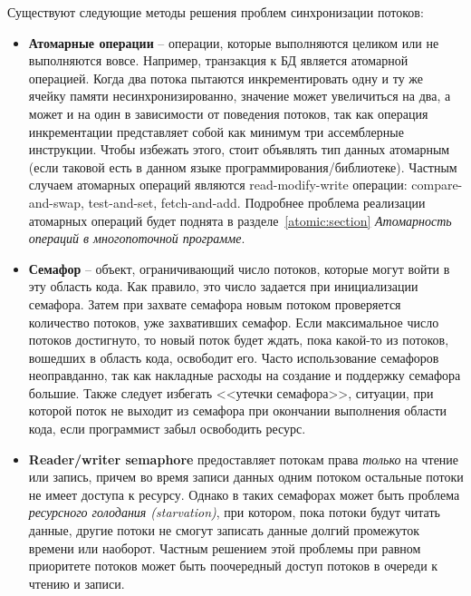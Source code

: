 Существуют следующие методы решения проблем синхронизации потоков:
\begin{itemize}
    \item\textbf{Атомарные операции} -- операции, которые выполняются целиком или не выполняются вовсе. Например, транзакция к БД является атомарной операцией. Когда два потока пытаются инкрементировать одну и ту же ячейку памяти несинхронизированно, значение может увеличиться на два, а может и на один в зависимости от поведения потоков, так как операция инкрементации представляет собой как минимум три ассемблерные инструкции. Чтобы избежать этого, стоит объявлять тип данных атомарным (если таковой есть в данном языке программирования/библиотеке). Частным случаем атомарных операций являются read-modify-write операции: compare-and-swap, test-and-set, fetch-and-add. Подробнее проблема реализации атомарных операций будет поднята в разделе~\ref{atomic:section} \textit{Атомарность операций в многопоточной программе}.
    
    \item\textbf{Семафор} -- объект, ограничивающий число потоков, которые могут войти в эту область кода. Как правило, это число задается при инициализации семафора. Затем при захвате семафора новым потоком проверяется количество потоков, уже захвативших семафор. Если максимальное число потоков достигнуто, то новый поток будет ждать, пока какой-то из потоков, вошедших в область кода, освободит его. Часто использование семафоров неоправданно, так как накладные расходы на создание и поддержку семафора большие. Также следует избегать <<утечки семафора>>, ситуации, при которой поток не выходит из семафора при окончании выполнения области кода, если программист забыл освободить ресурс.
    
    \item\textbf{Reader/writer semaphore} предоставляет потокам права \textit{только} на чтение или запись, причем во время записи данных одним потоком остальные потоки не имеет доступа к ресурсу. Однако в таких семафорах может быть проблема \textit{ресурсного голодания (starvation)}, при котором, пока потоки будут читать данные, другие потоки не смогут записать данные долгий промежуток времени или наоборот. Частным решением этой проблемы при равном приоритете потоков может быть поочередный доступ потоков в очереди к чтению и записи.
    

\end{itemize}
